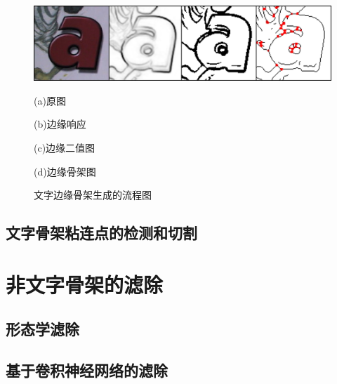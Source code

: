         \begin{figure}[!h]
        \centering
        \includegraphics[width=\textwidth]{./figures/c32_skeleton.jpg}
        \begin{minipage}[t]{0.24\linewidth}
        \centerline{\small (a)原图}
        \end{minipage}
        \begin{minipage}[t]{0.24\linewidth}
        \centerline{\small (b)边缘响应}
        \end{minipage}
        \begin{minipage}[t]{0.24\linewidth}
        \centerline{\small(c)边缘二值图}
        \end{minipage}
        \begin{minipage}[t]{0.24\linewidth}
        \centerline{\small (d)边缘骨架图}
        \end{minipage}
        \caption{文字边缘骨架生成的流程图}
        \label{fig.c32_skeleton}
        \end{figure}

        \subsection{文字骨架粘连点的检测和切割}

    \section{非文字骨架的滤除}

        \subsection{形态学滤除}

        \subsection{基于卷积神经网络的滤除}

